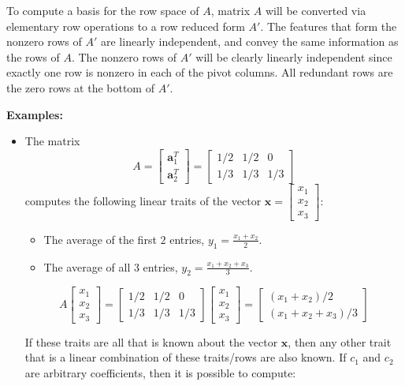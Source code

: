 \documentclass{article}
\begin{document}
To compute a basis for the row space of \(A\), matrix \(A\) will be converted via elementary row operations to a row reduced form \(A'\). The features that form the nonzero rows of \(A'\) are linearly independent, and convey the same information as the rows of \(A\). The nonzero rows of \(A'\) will be clearly linearly independent since exactly one row is nonzero in each of the pivot columns. All redundant rows are the zero rows at the bottom of \(A'\). 

\vspace{5mm}

\textbf{Examples:}
\begin{itemize}
\item The matrix 
\[A = \begin{bmatrix} \mathbf{a}_1^T \\ \mathbf{a}_2^T \end{bmatrix} = \begin{bmatrix}
1/2 & 1/2 & 0 \\ 
1/3 & 1/3 & 1/3
\end{bmatrix}\]
computes the following linear traits of the vector \(\mathbf{x} = \begin{bmatrix} x_1 \\ x_2 \\ x_3 \end{bmatrix}\):
\begin{itemize}
\item The average of the first \(2\) entries, \(y_1 = \frac{x_1 + x_2}{2}\). 
\item The average of all \(3\) entries, \(y_2 = \frac{x_1 + x_2 + x_3}{3}\).
\end{itemize}
\[A\begin{bmatrix} x_1 \\ x_2 \\ x_3 \end{bmatrix} = \begin{bmatrix}
1/2 & 1/2 & 0 \\ 
1/3 & 1/3 & 1/3
\end{bmatrix}\begin{bmatrix} x_1 \\ x_2 \\ x_3 \end{bmatrix} = \begin{bmatrix}
(x_1 + x_2)/2 \\ (x_1 + x_2 + x_3)/3
\end{bmatrix}\]

If these traits are all that is known about the vector \(\mathbf{x}\), then any other trait that is a linear combination of these traits/rows are also known. If \(c_1\) and \(c_2\) are arbitrary coefficients, then it is possible to compute:


\end{itemize}
\end{document}

